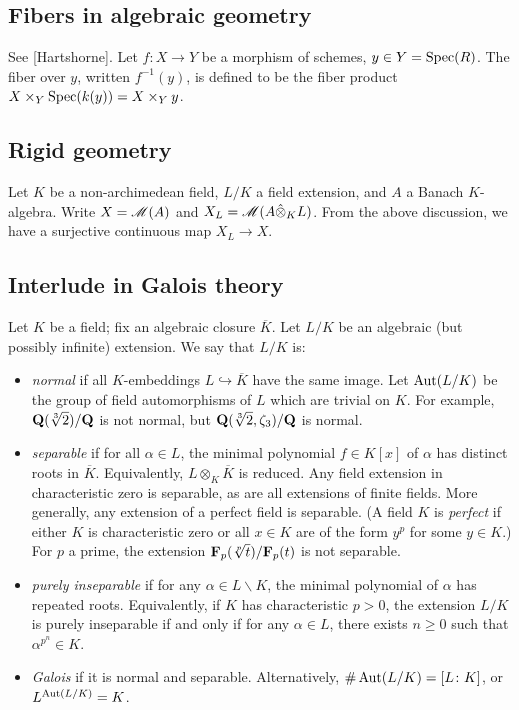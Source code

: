\subsection{Fibers in algebraic geometry}

See [Hartshorne]. Let $f\colon X\to Y$ be a morphism of schemes, 
$y\in Y=\operatorname{Spec}(R)$. The fiber over $y$, written $f^{-1}(y)$, is defined to be 
the fiber product $X\times_Y \operatorname{Spec}(k(y)) = X\times_Y y$. 





\subsection{Rigid geometry}

Let $K$ be a non-archimedean field, $L/K$ a field extension, and $A$ a Banach 
$K$-algebra. Write $X=\operatorname{\mathscr{M}}(A)$ and $X_L=\operatorname{\mathscr{M}}(A\hat\otimes_K L)$. From 
the above discussion, we have a surjective continuous map $X_L\to X$. 




\subsection{Interlude in Galois theory}

Let $K$ be a field; fix an algebraic closure $\overline K$. Let $L/K$ be an 
algebraic (but possibly infinite) extension. We say that $L/K$ is:
\begin{itemize}
\item
\emph{normal} if all $K$-embeddings $L\hookrightarrow \overline K$ have the 
same image. Let $\operatorname{Aut}(L/K)$ be the group of field automorphisms of $L$ which 
are trivial on $K$. For example, $\mathbf{Q}(\sqrt[3]{2})/\mathbf{Q}$ is not normal, but 
$\mathbf{Q}(\sqrt[3]{2},\zeta_3)/\mathbf{Q}$ is normal. 

\item
\emph{separable} if for all $\alpha\in L$, the minimal polynomial 
$f\in K[x]$ of $\alpha$ has distinct roots in $\overline K$. Equivalently, 
$L\otimes_K \overline K$ is reduced. Any field extension in characteristic 
zero is separable, as are all extensions of finite fields. More generally, any 
extension of a perfect field is separable. (A field $K$ is \emph{perfect} if 
either $K$ is characteristic zero or all $x\in K$ are of the form $y^p$ for 
some $y\in K$.) For $p$ a prime, the extension $\mathbf{F}_p(\sqrt[p]{t})/\mathbf{F}_p(t)$ is 
not separable. 

\item
\emph{purely inseparable} if for any $\alpha\in L\smallsetminus K$, the minimal 
polynomial of $\alpha$ has repeated roots. Equivalently, if $K$ has 
characteristic $p>0$, the extension $L/K$ is purely inseparable if and only if 
for any $\alpha\in L$, there exists $n\geqslant 0$ such that 
$\alpha^{p^n}\in K$. 

\item
\emph{Galois} if it is normal and separable. Alternatively, 
$\# \operatorname{Aut}(L/K)=[L\colon K]$, or $L^{\operatorname{Aut}(L/K)} = K$. 
\end{itemize}

